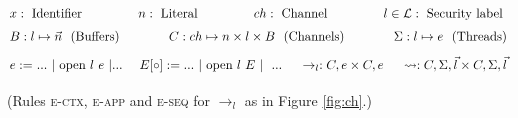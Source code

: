 \documentclass[10pt,preprint]{sigplanconf}
\renewcommand{\t}[1]{~\text{#1}~}
\begin{document}
\begin{figure*}
\[ \arraycolsep=1.6pt\def\arraystretch{1.5}
\begin{array}{rl}
  \multicolumn{2}{l}{x : \t{Identifier} \hfill n : \t{Literal} \hfill ch : \t{Channel} \hfill l \in \mathcal{L} : \t{Security label}} \\
  \multicolumn{2}{l}{
    B : l \mapsto \vec{n} ~~(\text{Buffers})~~\hfill~~
    C : ch \mapsto n \times l \times B~~(\text{Channels})~~\hfill~~
    \Sigma : l \mapsto e ~~(\text{Threads})} \\[1ex]
  e := & ... ~| \t{open} l~e ~| ...~~\hfill~~
    E[\circ] := ...~| \t{open} l~E~| ~~...~~\hfill~~\rightarrow_l : C,e \times C,e ~~\hfill~~ \leadsto : C, \Sigma, \vec{l} \times C, \Sigma, \vec{l}
  \end{array} \\
\]

\begin{center}
  (Rules \textsc{e-ctx}, \textsc{e-app} and \textsc{e-seq} for $\rightarrow_l$ as in Figure \ref{fig:ch}.) \\[1em]


\end{center}
\end{figure*}
\end{document}
